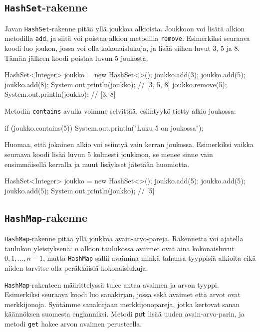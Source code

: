 \subsection{\texttt{HashSet}-rakenne}

Javan \texttt{HashSet}-rakenne pitää yllä joukkoa alkioista.
Joukkoon voi lisätä alkion metodilla \texttt{add},
ja siitä voi poistaa alkion metodilla \texttt{remove}.
Esimerkiksi seuraava koodi luo joukon, jossa voi olla
kokonaislukuja, ja lisää siihen luvut 3, 5 ja 8.
Tämän jälkeen koodi poistaa luvun 5 joukosta.

\begin{code}
HashSet<Integer> joukko = new HashSet<>();
joukko.add(3);
joukko.add(5);
joukko.add(8);
System.out.println(joukko); // [3, 5, 8]
joukko.remove(5);
System.out.println(joukko); // [3, 8]
\end{code}

Metodin \texttt{contains} avulla voimme selvittää,
esiintyykö tietty alkio joukossa:

\begin{code}
if (joukko.contains(5)) {
    System.out.println("Luku 5 on joukossa");
}
\end{code}

Huomaa, että jokainen alkio voi esiintyä vain kerran joukossa.
Esimerkiksi vaikka seuraava koodi lisää luvun 5 kolmesti
joukkoon, se menee sinne vain ensimmäisellä kerralla ja
muut lisäykset jätetään huomiotta.

\begin{code}
HashSet<Integer> joukko = new HashSet<>();
joukko.add(5);
joukko.add(5);
joukko.add(5);
System.out.println(joukko); // [5]
\end{code}

\subsection{\texttt{HashMap}-rakenne}

\texttt{HashMap}-rakenne pitää yllä joukkoa avain-arvo-pareja.
Rakennetta voi ajatella taulukon yleistyksenä:
$n$ alkion taulukossa avaimet ovat aina kokonaisluvut
$0,1,\ldots,n-1$, mutta \texttt{HashMap} sallii
avaimina minkä tahansa tyyppisiä alkioita eikä niiden
tarvitse olla peräkkäisiä kokonaislukuja.

\texttt{HashMap}-rakenteen määrittelyssä tulee antaa
avaimen ja arvon tyyppi.
Esimerkiksi seuraava koodi luo sanakirjan, jossa sekä
avaimet että arvot ovat merkkijonoja.
Syötämme sanakirjaan merkkijonopareja, jotka kertovat
sanan käännöksen suomesta englanniksi.
Metodi \texttt{put} lisää uuden avain-arvo-parin,
ja metodi \texttt{get} hakee arvon avaimen perusteella.

